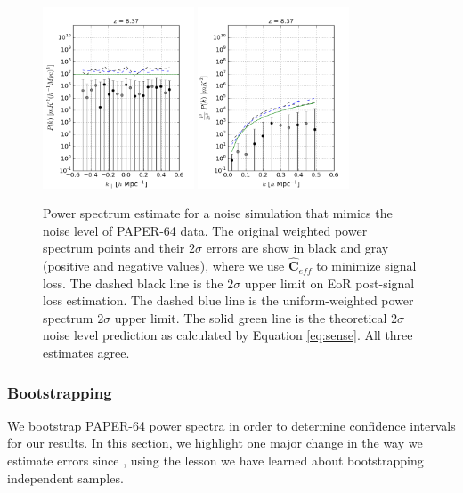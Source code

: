 \documentclass[preprint2,numberedappendix,tighten]{aastex6}  %
\begin{document}
\begin{figure}
	\centering
	\includegraphics[width=0.4\textwidth]{plots/ps1_noise_add.png}
	\includegraphics[width=0.4\textwidth]{plots/ps2_noise_add.png}
	\caption{Power spectrum estimate for a noise simulation that mimics the noise level of PAPER-64 data. The original weighted 
power spectrum points and their $2\sigma$ errors are show in black and gray (positive and negative values), where we use $
\widehat{\textbf{C}}_{eff}$ to minimize signal loss. The dashed black line is the $2\sigma$ upper limit on EoR post-signal loss estimation. The dashed blue line is the uniform-weighted power spectrum $2\sigma$ upper 
limit. The solid green line is the theoretical $2\sigma$ noise level prediction as calculated by Equation \eqref{eq:sense}. All three 
estimates agree.}
	\label{fig:ps_noise}
\end{figure}

\subsubsection{Bootstrapping}
\label{sec:Boot}

We bootstrap PAPER-64 power spectra in order to determine confidence intervals for our results. In this section, we highlight 
one major change in the way we estimate errors since , using the lesson we have learned about bootstrapping independent samples.
\end{document}
